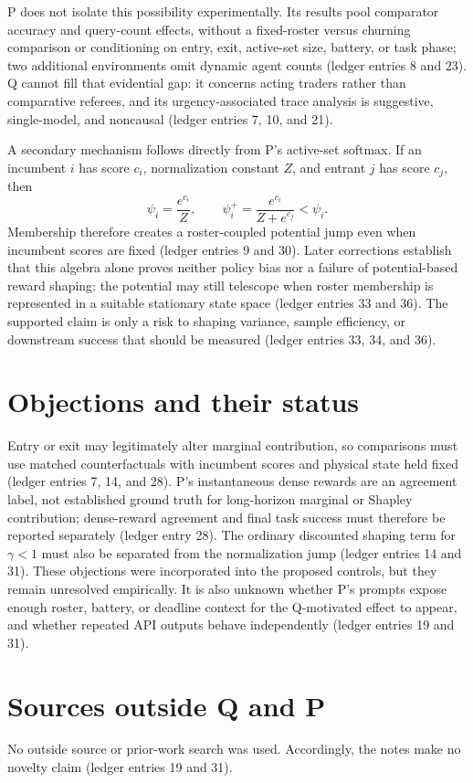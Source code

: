 \documentclass{article}
\begin{document}
P does not isolate this possibility experimentally.  Its results pool comparator accuracy and query-count effects, without a fixed-roster versus churning comparison or conditioning on entry, exit, active-set size, battery, or task phase; two additional environments omit dynamic agent counts (ledger entries 8 and 23).  Q cannot fill that evidential gap: it concerns acting traders rather than comparative referees, and its urgency-associated trace analysis is suggestive, single-model, and noncausal (ledger entries 7, 10, and 21).

A secondary mechanism follows directly from P's active-set softmax.  If an incumbent \(i\) has score \(c_i\), normalization constant \(Z\), and entrant \(j\) has score \(c_j\), then
\[
\psi_i=\frac{e^{c_i}}{Z},
\qquad
\psi_i^+=\frac{e^{c_i}}{Z+e^{c_j}}<\psi_i.
\]
Membership therefore creates a roster-coupled potential jump even when incumbent scores are fixed (ledger entries 9 and 30).  Later corrections establish that this algebra alone proves neither policy bias nor a failure of potential-based reward shaping: the potential may still telescope when roster membership is represented in a suitable stationary state space (ledger entries 33 and 36).  The supported claim is only a risk to shaping variance, sample efficiency, or downstream success that should be measured (ledger entries 33, 34, and 36).

\section*{Objections and their status}
Entry or exit may legitimately alter marginal contribution, so comparisons must use matched counterfactuals with incumbent scores and physical state held fixed (ledger entries 7, 14, and 28).  P's instantaneous dense rewards are an agreement label, not established ground truth for long-horizon marginal or Shapley contribution; dense-reward agreement and final task success must therefore be reported separately (ledger entry 28).  The ordinary discounted shaping term for \(\gamma<1\) must also be separated from the normalization jump (ledger entries 14 and 31).  These objections were incorporated into the proposed controls, but they remain unresolved empirically.  It is also unknown whether P's prompts expose enough roster, battery, or deadline context for the Q-motivated effect to appear, and whether repeated API outputs behave independently (ledger entries 19 and 31).

\section*{Sources outside Q and P}
No outside source or prior-work search was used.  Accordingly, the notes make no novelty claim (ledger entries 19 and 31).
\end{document}
